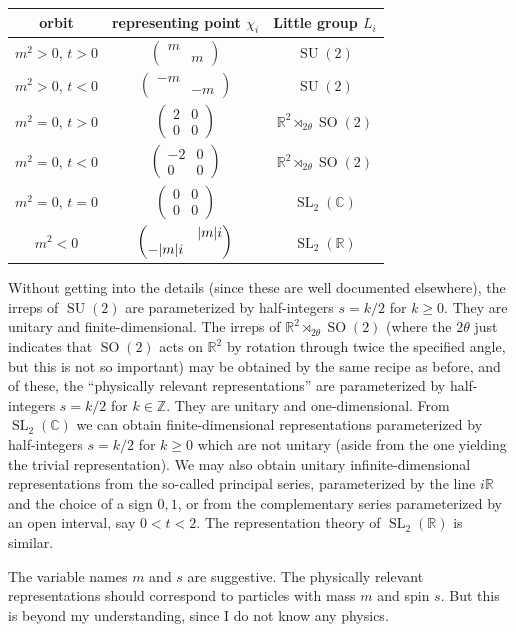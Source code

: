 \documentclass[11pt,leqno]{article}
\theoremstyle{plain}
\theoremstyle{definition}
\numberwithin{equation}{section}
\numberwithin{lem}{section}
\DeclareMathOperator{\SL}{SL}
\DeclareMathOperator{\SU}{SU}
\DeclareMathOperator{\SO}{SO}
\begin{document}
\begin{center}
\begin{tabular}{ c|c|c } 
orbit & representing point $\chi_i$ & Little group $L_i$ \\
\hline
$m^2>0$, $t>0$ & $\begin{pmatrix}
	m & \\ & m
\end{pmatrix}$ & $\SU(2)$ \\
$m^2>0$, $t<0$ & $\begin{pmatrix}
	-m & \\ & -m
\end{pmatrix}$ & $\SU(2)$ \\
$m^2=0$, $t>0$ & $\begin{pmatrix}
	2 & 0\\0 & 0
\end{pmatrix}$ & $\mathbb R^2\rtimes_{2\theta}\SO(2)$ \\
$m^2=0$, $t<0$ & $\begin{pmatrix}
	-2 & 0\\0 & 0
\end{pmatrix}$ & $\mathbb R^2\rtimes_{2\theta}\SO(2)$ \\
$m^2=0$, $t=0$ & $\begin{pmatrix}
	0 & 0\\0 & 0
\end{pmatrix}$ & $\SL_2(\mathbb C)$ \\
$m^2<0$ & $\begin{pmatrix}
	 & \abs{m}i\\-\abs{m}i & 
\end{pmatrix}$ & $\SL_2(\mathbb R)$
\end{tabular}
\end{center}
Without getting into the details (since these are well documented elsewhere), the irreps of $\SU(2)$ are parameterized by half-integers $s = k/2$ for $k\geq 0$. They are unitary and finite-dimensional. The irreps of $\mathbb R^2\rtimes_{2\theta}\SO(2)$ (where the $2\theta$ just indicates that $\SO(2)$ acts on $\mathbb R^2$ by rotation through twice the specified angle, but this is not so important) may be obtained by the same recipe as before, and of these, the ``physically relevant representations'' are parameterized by half-integers $s = k/2$ for $k\in \mathbb Z$. They are unitary and one-dimensional. From $\SL_2(\mathbb C)$ we can obtain finite-dimensional representations parameterized by half-integers $s = k/2$ for $k\geq 0$ which are not unitary (aside from the one yielding the trivial representation). We may also obtain unitary infinite-dimensional representations from the so-called principal series, parameterized by the line $i\mathbb R$ and the choice of a sign $0,1$, or from the complementary series parameterized by an open interval, say $0<t<2$. The representation theory of $\SL_2(\mathbb R)$ is similar.

The variable names $m$ and $s$ are suggestive. The physically relevant representations should correspond to particles with mass $m$ and spin $s$. But this is beyond my understanding, since I do not know any physics.
\end{document}
